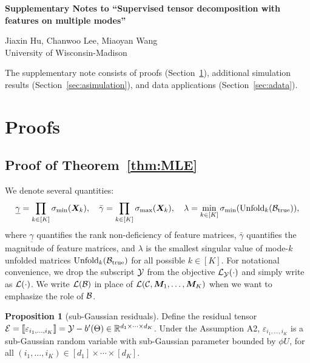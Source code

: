 \documentclass[12pt]{article}
\theoremstyle{definition}
\newtheorem{prop}{Proposition}[section]
\begin{document}
\def\spacingset#1{\renewcommand{\baselinestretch}%
{#1}\small\normalsize} \spacingset{1.5}




\begin{center}
{\Large\bf Supplementary Notes to ``Supervised tensor decomposition with features on multiple modes''}

\vspace{.5cm}

{\large Jiaxin Hu, Chanwoo Lee, Miaoyan Wang}\\
University of Wisconsin-Madison

\vspace{.5cm}
\end{center}
\appendix
\renewcommand{\thefigure}{S\arabic{figure}}
\setcounter{figure}{0}   
\renewcommand{\thetable}{S\arabic{table}}
\setcounter{table}{0}   



The supplementary note consists of proofs (Section~\ref{sec:appendix}), additional simulation results (Section~\ref{sec:asimulation}), and data applications (Section~\ref{sec:adata}).

\section{Proofs}\label{sec:appendix}
\subsection{Proof of Theorem~\ref{thm:MLE}}
We denote several quantities:
\begin{equation}\label{eq:quantities}
\underline \gamma = \prod_{k\in[K]} \sigma_{\min}(\bm X_k),\quad \bar \gamma =\prod_{k\in[K]}\sigma_{\max}(\bm X_k),  \quad \lambda =\min_{k\in[K]}\sigma_{\min}(\text{Unfold}_k(\mathcal{B}_{\text{true}})),
\end{equation}
where $\underline{\gamma}$ quantifies the rank non-deficiency of feature matrices, $\bar \gamma$ quantifies the magnitude of feature matrices, and $\lambda$ is the smallest singular value of mode-$k$ unfolded matrices $\text{Unfold}_k(\mathcal{B}_{\textup{true}})$ for all possible $k\in[K]$. 
For notational convenience, we drop the subscript $\mathcal{Y}$ from the objective $\mathcal{L}_{\mathcal{Y}}(\cdot)$ and simply write as $\mathcal{L}(\cdot)$. We write $\mathcal{L}(\mathcal{B})$ in place of $\mathcal{L}(\mathcal{C}, \bm M_1,\ldots,\bm M_K)$ when we want to emphasize the role of $\mathcal{B}$. 

\begin{prop}[sub-Gaussian residuals]\label{prop}
Define the residual tensor $\mathcal{E}=\llbracket \varepsilon_{i_1,\ldots,i_K} \rrbracket=\mathcal{Y}-b'(\Theta)\in\mathbb{R}^{d_1\times \cdots \times d_K}$. Under the Assumption A2, $\varepsilon_{i_1,\ldots,i_K}$ is a sub-Gaussian random variable with sub-Gaussian parameter bounded by $\phi U$, for all $(i_1,\ldots,i_K)\in[d_1]\times\cdots\times[d_K]$.
\end{prop}
\end{document}
